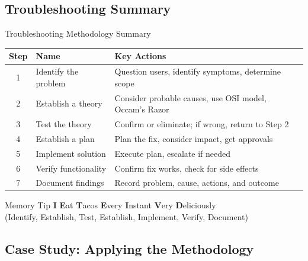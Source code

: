 \documentclass[aspectratio=169]{beamer}  %
\begin{document}
\subsection{Troubleshooting Summary}

\begin{frame}{Troubleshooting Methodology Summary}
    \begin{center}
        \small
        \begin{tabular}{c l l}
            \toprule
            \textbf{Step} & \textbf{Name} & \textbf{Key Actions} \\
            \midrule
            1 & Identify the problem & Question users, identify symptoms, determine scope \\
            2 & Establish a theory & Consider probable causes, use OSI model, Occam's Razor \\
            3 & Test the theory & Confirm or eliminate; if wrong, return to Step 2 \\
            4 & Establish a plan & Plan the fix, consider impact, get approvals \\
            5 & Implement solution & Execute plan, escalate if needed \\
            6 & Verify functionality & Confirm fix works, check for side effects \\
            7 & Document findings & Record problem, cause, actions, and outcome \\
            \bottomrule
        \end{tabular}
    \end{center}
    
    \vspace{0.5em}
    \begin{block}{Memory Tip}
        \textbf{I} \textbf{E}at \textbf{T}acos \textbf{E}very \textbf{I}nstant \textbf{V}ery \textbf{D}eliciously \\
        {\small (Identify, Establish, Test, Establish, Implement, Verify, Document)}
    \end{block}
\end{frame}

\subsection{Case Study: Applying the Methodology}
\end{document}
